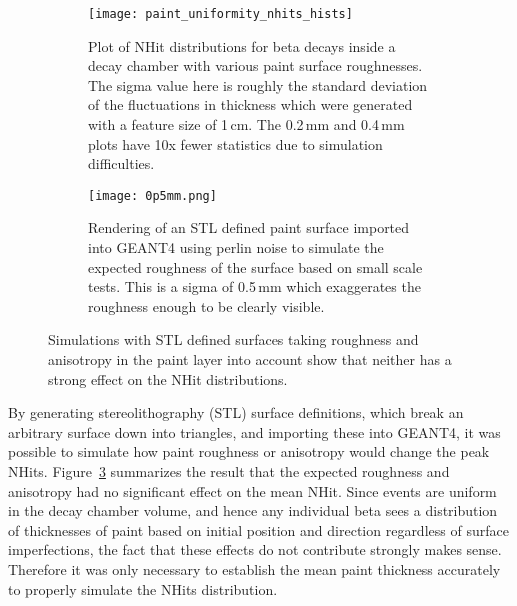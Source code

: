 \begin{figure}[h!]
\begin{subfigure}{.53\textwidth}
  \texttt{[image: paint\_uniformity\_nhits\_hists]}
  \caption{Plot of NHit distributions for \Li beta decays inside a decay chamber with various paint surface roughnesses. The sigma value here is roughly the standard deviation of the fluctuations in thickness which were generated with a feature size of 1\,cm. The 0.2\,mm and 0.4\,mm plots have 10x fewer statistics due to simulation difficulties.}
  \label{fig:simulations}
\end{subfigure}
\hspace{0.5cm}
\begin{subfigure}{.38\textwidth}
  \centering
  \texttt{[image: 0p5mm.png]}
  \caption{Rendering of an STL defined paint surface imported into GEANT4 using perlin noise to simulate the expected roughness of the surface based on small scale tests. This is a sigma of 0.5\,mm which exaggerates the roughness enough to be clearly visible.}
  \label{fig:rough_sphere}
\end{subfigure}
\caption{Simulations with STL defined surfaces taking roughness and anisotropy in the paint layer into account show that neither has a strong effect on the NHit distributions.}
\label{fig:stltests}
\end{figure}

By generating stereolithography (STL) surface definitions, which break an arbitrary surface down into triangles, and importing these into GEANT4, it was possible to simulate how paint roughness or anisotropy would change the peak NHits. Figure~\ref{fig:stltests} summarizes the result that the expected roughness and anisotropy had no significant effect on the mean NHit. Since events are uniform in the decay chamber volume, and hence any individual beta sees a distribution of thicknesses of paint based on initial position and direction regardless of surface imperfections, the fact that these effects do not contribute strongly makes sense. Therefore it was only necessary to establish the mean paint thickness accurately to properly simulate the NHits distribution.

